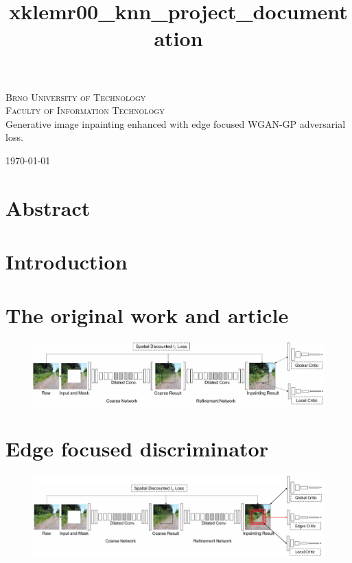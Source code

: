 \documentclass[a4paper, 11pt]{article}
\title{xklemr00\_knn\_project\_documentation}
\begin{document}
    \begin{titlepage}
 \begin{center}
  {\Huge\textsc{Brno University of Technology\\[0.3em]
    \huge{Faculty of Information Technology}}}\\
  {\Huge
  Generative image inpainting enhanced with edge focused WGAN-GP adversarial loss.}
 \end{center}
 {\Large 
 \today 
 \hfill
}
\end{titlepage}

\newpage
\section{Abstract}
\label{section:abstract}

\section{Introduction}
\label{section:introduction}

\section{The original work and article}
\label{section:origin}
    \begin{figure}
        \centering
        \includegraphics[width=0.95\linewidth]{documentation/img/original_arch.png}
    \end{figure}


\section{Edge focused discriminator}
\label{section:edgeDiscriminator}
    \begin{figure}
        \centering
        \includegraphics[width=0.95\linewidth]{documentation/img/new_arch.png}
    \end{figure}
\end{document}
